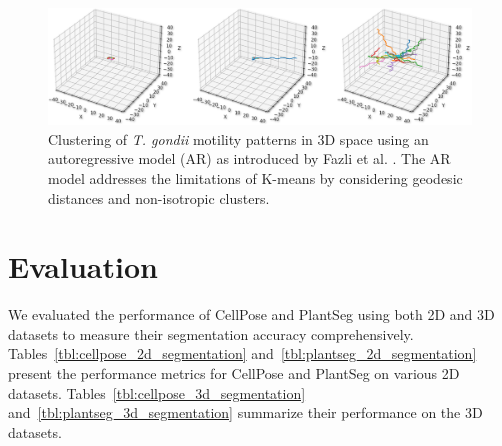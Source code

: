 \documentclass[./dissertation.tex]{subfiles}
\begin{document}
\begin{figure}[h]
    \centering\includegraphics[width=.9\textwidth]{figures/tseg/clusters plot.png}
    \caption{Clustering of \textit{\textit{T. gondii}} motility patterns in 3D space using an autoregressive model (AR) as introduced by Fazli et al. \cite{fazli2019lightweight}. The AR model addresses the limitations of K-means by considering geodesic distances and non-isotropic clusters.}
    \label{fig:clustering}
\end{figure}



\section{Evaluation}

We evaluated the performance of CellPose and PlantSeg using both 2D and 3D datasets to measure their segmentation accuracy comprehensively. Tables~\ref{tbl:cellpose_2d_segmentation} and~\ref{tbl:plantseg_2d_segmentation} present the performance metrics for CellPose and PlantSeg on various 2D datasets. Tables~\ref{tbl:cellpose_3d_segmentation} and~\ref{tbl:plantseg_3d_segmentation} summarize their performance on the 3D datasets.
\end{document}
